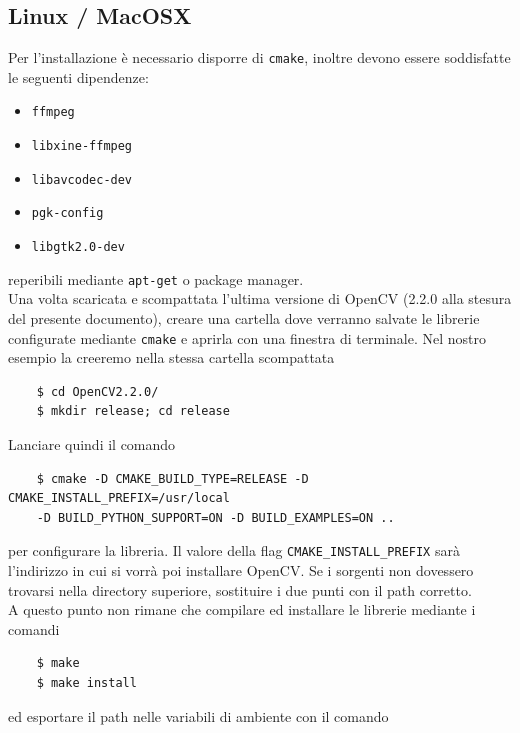 \documentclass[12pt]{report}
\begin{document}
\subsection{Linux / MacOSX}

\noindent Per l'installazione \`e necessario disporre di \verb|cmake|, inoltre devono essere soddisfatte le seguenti dipendenze:
\begin{itemize}
\item \verb|ffmpeg|
\item \verb|libxine-ffmpeg|
\item \verb|libavcodec-dev|
\item \verb|pgk-config|
\item \verb|libgtk2.0-dev|
\end{itemize}

\noindent reperibili mediante \verb|apt-get| o package manager.\\

\noindent Una volta scaricata e scompattata l'ultima versione di OpenCV (2.2.0 alla stesura del presente documento), creare una cartella dove verranno salvate le librerie configurate mediante \verb|cmake| e aprirla con una finestra di terminale. Nel nostro esempio la creeremo nella stessa cartella scompattata

\begin{verbatim}
	$ cd OpenCV2.2.0/
	$ mkdir release; cd release
\end{verbatim}

\noindent Lanciare quindi il comando

\begin{verbatim}
	$ cmake -D CMAKE_BUILD_TYPE=RELEASE -D CMAKE_INSTALL_PREFIX=/usr/local
	-D BUILD_PYTHON_SUPPORT=ON -D BUILD_EXAMPLES=ON ..
\end{verbatim}

\noindent per configurare la libreria. Il valore della flag \verb|CMAKE_INSTALL_PREFIX| sar\`a l'indirizzo in cui si vorr\`a poi installare OpenCV. Se i sorgenti non dovessero trovarsi nella directory superiore, sostituire i due punti con il path corretto.\\

\noindent A questo punto non rimane che compilare ed installare le librerie mediante i comandi

\begin{verbatim}
	$ make
	$ make install
\end{verbatim}

\noindent ed esportare il path nelle variabili di ambiente con il comando
\end{document}
